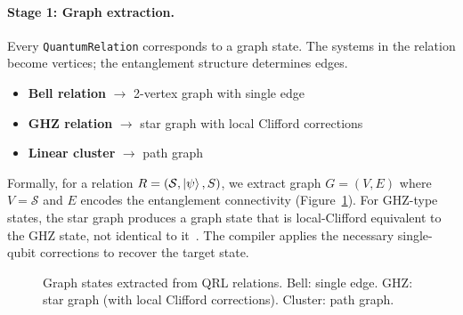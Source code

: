 \documentclass[submission,copyright,creativecommons]{eptcs}
\newcommand{\qrl}{\textsc{QRL}}
\begin{document}
\paragraph{Stage 1: Graph extraction.}
Every \texttt{QuantumRelation} corresponds to a graph state. The systems in
the relation become vertices; the entanglement structure determines edges.

\begin{itemize}
    \item \textbf{Bell relation} $\rightarrow$ 2-vertex graph with single edge
    \item \textbf{GHZ relation} $\rightarrow$ star graph with local Clifford corrections
    \item \textbf{Linear cluster} $\rightarrow$ path graph
\end{itemize}

Formally, for a relation $R = (\mathcal{S}, \ket{\psi}, S)$, we extract
graph $G = (V, E)$ where $V = \mathcal{S}$ and $E$ encodes the entanglement
connectivity (Figure~\ref{fig:graphs}). For GHZ-type states, the star graph
produces a graph state that is local-Clifford equivalent to the GHZ state,
not identical to it~\cite{raussendorf2003}. The compiler applies the
necessary single-qubit corrections to recover the target state.

\begin{figure}[ht]
\centering
{}
\caption{Graph states extracted from \qrl{} relations. Bell: single edge.
GHZ: star graph (with local Clifford corrections). Cluster: path graph.}
\label{fig:graphs}
\end{figure}
\end{document}
